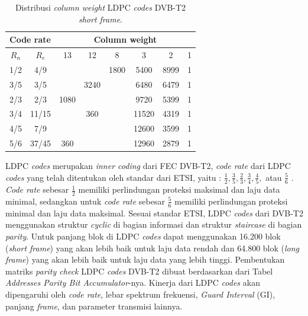 \begin{table} [tb]
	\renewcommand{\figurename}{Table}
	\centering 
	\caption{Distribusi \textit{column weight} LDPC \textit{codes} DVB-T2 \textit{short frame}.}
	\label{table:dvb-t2lite}
	\begin{tabular}{|c|c|c|c|c|c|c|c|}
		\hline
		\multicolumn{2}{|c|}{Code rate} & \multicolumn{6}{c|}{Column weight}    \\ \hline
		$R_n$  & $R_e$  & 13   & 12   & 8    & 3     & 2    & 1 \\ \hline
		1/2           & 4/9             &      &      & 1800 & 5400  & 8999 & 1 \\ \hline
		3/5           & 3/5             &      & 3240 &      & 6480  & 6479 & 1 \\ \hline
		2/3           & 2/3             & 1080 &      &      & 9720  & 5399 & 1 \\ \hline
		3/4           & 11/15           &      & 360  &      & 11520 & 4319 & 1 \\ \hline
		4/5           & 7/9             &      &      &      & 12600 & 3599 & 1 \\ \hline
		5/6           & 37/45           & 360  &      &      & 12960 & 2879 & 1 \\ \hline
	\end{tabular}
	
	
\end{table}

LDPC \textit{codes} merupakan \textit{inner coding} dari FEC DVB-T2, \textit{code rate} dari LDPC \textit{codes} yang telah ditentukan oleh standar dari ETSI, yaitu : $\frac{1}{2}, \frac{3}{5}, \frac{2}{3}, \frac{3}{4}, \frac{4}{5},$ atau $\frac{5}{6}$ \cite{etsi2}. \textit{Code rate} sebesar $\frac{1}{2}$ memiliki perlindungan proteksi maksimal dan laju data minimal, sedangkan untuk \textit{code rate} sebesar $\frac{5}{6}$ memiliki perlindungan proteksi minimal dan laju data maksimal. Sesuai standar ETSI, LDPC \textit{codes} dari DVB-T2 menggunakan struktur \textit{cyclic} di bagian informasi dan struktur \textit{staircase} di bagian \textit{parity}. Untuk panjang blok di LDPC \textit{codes} dapat menggunakan 16.200 blok (\textit{short frame}) yang akan lebih baik untuk laju data rendah dan 64.800 blok (\textit{long frame}) yang akan lebih baik untuk laju data yang lebih tinggi. Pembentukan matriks \textit{parity check} LDPC \textit{codes} DVB-T2 dibuat berdasarkan dari Tabel \textit{Addresses Parity Bit Accumulator}-nya. Kinerja dari LDPC \textit{codes} akan dipengaruhi oleh \textit{code rate}, lebar spektrum frekuensi, \textit{Guard Interval} (GI), panjang \textit{frame}, dan parameter transmisi lainnya.

